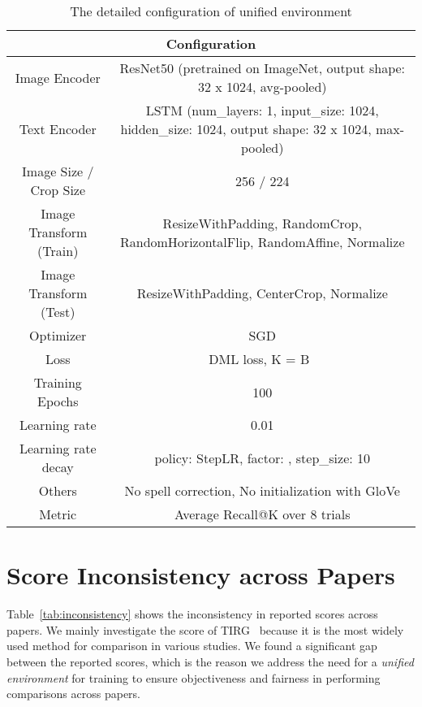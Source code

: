 \documentclass[10pt,twocolumn,letterpaper]{article}
\begin{document}
    \begin{table*}[t]
    \caption{The detailed configuration of unified environment}
    \centering
    \begin{adjustbox}{width=1.0\textwidth}
    \begin{tabular}{cc}
        \toprule
        \multicolumn{2}{c}{Configuration} \\
        \hline \hline
        Image Encoder & ResNet50 (pretrained on ImageNet, output shape: 32 x 1024, avg-pooled) \\
        Text Encoder & LSTM (num\_layers: 1, input\_size: 1024, hidden\_size: 1024, output shape: 32 x 1024, max-pooled) \\
        Image Size / Crop Size & 256 / 224 \\
        Image Transform (Train) & ResizeWithPadding, RandomCrop, RandomHorizontalFlip, RandomAffine, Normalize\\
        Image Transform (Test) & ResizeWithPadding, CenterCrop, Normalize \\
        Optimizer & SGD \\
        Loss & DML loss, K = B~\cite{vo2019composing} \\
        Training Epochs & 100 \\
        Learning rate & 0.01 \\
        Learning rate decay & policy: StepLR, factor: , step\_size: 10 \\
        Others & No spell correction, No initialization with GloVe  \\
        Metric & Average Recall@K over 8 trials  \\
        \bottomrule
    \end{tabular}
    \end{adjustbox}
    \label{tab:training_standard}
\end{table*}
    
\section{Score Inconsistency across Papers}
Table~\ref{tab:inconsistency} shows the inconsistency in reported scores across papers. We mainly investigate the score of TIRG~\cite{vo2019composing} because it is the most widely used method for comparison in various studies. We found a significant gap between the reported scores, which is the reason we address the need for a \textit{unified environment} for training to ensure objectiveness and fairness in performing comparisons across papers.
\end{document}

